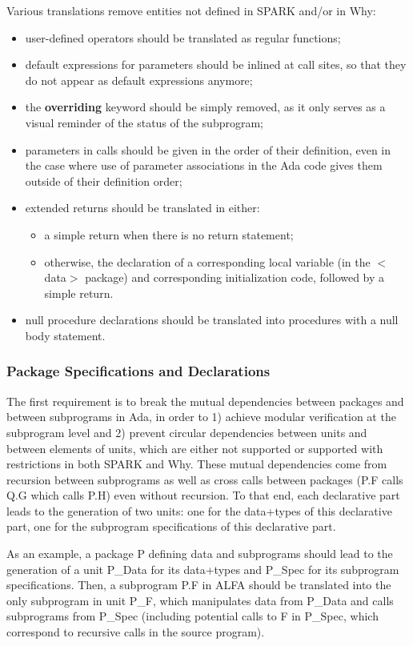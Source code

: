 \documentclass[fullpage]{article}
\newcounter{example}
\newcommand{\kw}[1]{\textbf{#1}}
\begin{document}
Various translations remove entities not defined in SPARK and/or in Why:
\begin{itemize}
\item user-defined operators should be translated as regular functions;
\item default expressions for parameters should be inlined at call sites, so
  that they do not appear as default expressions anymore;
\item the \kw{overriding} keyword should be simply removed, as it only serves
  as a visual reminder of the status of the subprogram;
\item parameters in calls should be given in the order of their definition,
  even in the case where use of parameter associations in the Ada code gives
  them outside of their definition order;
\item extended returns should be translated in either:
  \begin{itemize}
  \item a simple return when there is no return statement;
  \item otherwise, the declaration of a corresponding local variable (in the
    $<$data$>$ package) and corresponding initialization code, followed by a
    simple return.
  \end{itemize}
\item null procedure declarations should be translated into procedures with a
  null body statement.
\end{itemize}

\subsubsection{Package Specifications and Declarations}

The first requirement is to break the mutual dependencies between packages and
between subprograms in Ada, in order to 1) achieve modular verification at the
subprogram level and 2) prevent circular dependencies between units and between
elements of units, which are either not supported or supported with
restrictions in both SPARK and Why. These mutual dependencies come from
recursion between subprograms as well as cross calls between packages (P.F
calls Q.G which calls P.H) even without recursion. To that end, each
declarative part leads to the generation of two units: one for the data+types
of this declarative part, one for the subprogram specifications of this
declarative part.

As an example, a package P defining data and subprograms should lead to the
generation of a unit P\_Data for its data+types and P\_Spec for its subprogram
specifications. Then, a subprogram P.F in ALFA should be translated into the
only subprogram in unit P\_F, which manipulates data from P\_Data and calls
subprograms from P\_Spec (including potential calls to F in P\_Spec, which
correspond to recursive calls in the source program).
\end{document}
